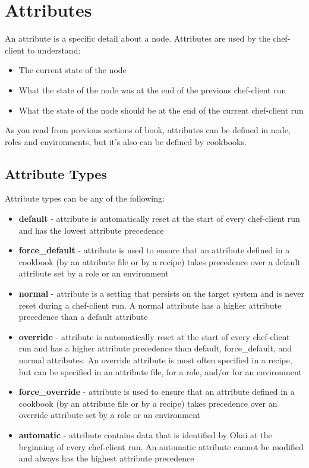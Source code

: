 \section{Attributes}

An attribute is a specific detail about a node. Attributes are used by the chef-client to understand:

\begin{itemize}
  \item The current state of the node
  \item What the state of the node was at the end of the previous chef-client run
  \item What the state of the node should be at the end of the current chef-client run
\end{itemize}

As you read from previous sections of book, attributes can be defined in node, roles and environments, but it's also can be defined by cookbooks.

\subsection{Attribute Types}

Attribute types can be any of the following:

\begin{itemize}
  \item \textbf{default} - attribute is automatically reset at the start of every chef-client run and has the lowest attribute precedence
  \item \textbf{force\_default} - attribute is used to ensure that an attribute defined in a cookbook (by an attribute file or by a recipe) takes precedence over a default attribute set by a role or an environment
  \item \textbf{normal} - attribute is a setting that persists on the target system and is never reset during a chef-client run. A normal attribute has a higher attribute precedence than a default attribute
  \item \textbf{override} - attribute is automatically reset at the start of every chef-client run and has a higher attribute precedence than default, force\_default, and normal attributes. An override attribute is most often specified in a recipe, but can be specified in an attribute file, for a role, and/or for an environment
  \item \textbf{force\_override} - attribute is used to ensure that an attribute defined in a cookbook (by an attribute file or by a recipe) takes precedence over an override attribute set by a role or an environment
  \item \textbf{automatic} - attribute contains data that is identified by Ohai at the beginning of every chef-client run. An automatic attribute cannot be modified and always has the highest attribute precedence
\end{itemize}


